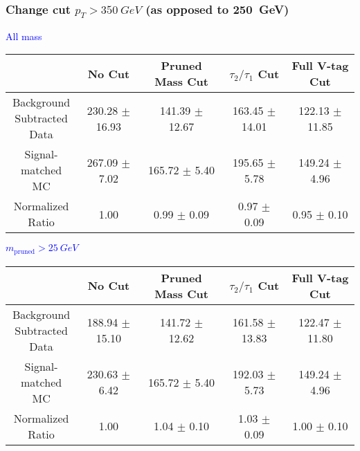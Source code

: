 \documentclass{beamer}
\newcommand{\backupend}{
  \addtocounter{framenumbervorappendix}{-\value{framenumber}}
  \addtocounter{framenumber}{\value{framenumbervorappendix}} 
}
\begin{document}
\begin{frame}
  \frametitle{Change cut $p_T > \SI{350}{GeV}$ (as opposed to \SI{250}{GeV})}
  \begin{adjustwidth}{-1.5em}{-1.5em}
    \centering
    \vspace{6pt}
    \textcolor{blue}{All mass}
    \vspace{6pt}

    {\scriptsize
      \begin{tabular}{| c | c | c | c | c |}
        \hline
        & No Cut & Pruned Mass Cut & $\tau_2/\tau_1$ Cut & Full V-tag Cut \\
        \hline
        \makecell{Background \\ Subtracted \\ Data} & 230.28 $\pm$ 16.93 & 141.39 $\pm$ 12.67 & 163.45 $\pm$ 14.01 & 122.13 $\pm$ 11.85 \\
        \makecell{Signal-\\ matched MC} & 267.09 $\pm$ 7.02 & 165.72 $\pm$ 5.40 & 195.65 $\pm$ 5.78 & 149.24 $\pm$ 4.96 \\
        \hline
        \makecell{Normalized \\ Ratio} & 1.00 & 0.99 $\pm$ 0.09 & 0.97 $\pm$ 0.09 & 0.95 $\pm$ 0.10 \\
        \hline
      \end{tabular}
    }

    \vspace{6pt}
    \textcolor{blue}{$m_\text{pruned} > \SI{25}{GeV}$}
    \vspace{6pt}

    {\scriptsize
      \begin{tabular}{| c | c | c | c | c |}
        \hline
        & No Cut & Pruned Mass Cut & $\tau_2/\tau_1$ Cut & Full V-tag Cut \\
        \hline
        \makecell{Background \\ Subtracted \\ Data} & 188.94 $\pm$ 15.10 & 141.72 $\pm$ 12.62 & 161.58 $\pm$ 13.83 & 122.47 $\pm$ 11.80 \\
        \makecell{Signal-\\ matched MC} & 230.63 $\pm$ 6.42 & 165.72 $\pm$ 5.40 & 192.03 $\pm$ 5.73 & 149.24 $\pm$ 4.96 \\
        \hline
        \makecell{Normalized \\ Ratio} & 1.00 & 1.04 $\pm$ 0.10 & 1.03 $\pm$ 0.09 & 1.00 $\pm$ 0.10 \\
        \hline
      \end{tabular}
    }
  \end{adjustwidth}
\end{frame}



\backupend
\end{document}
